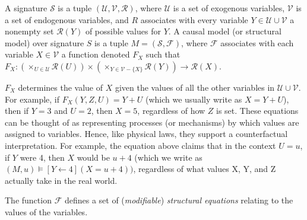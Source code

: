 \documentclass{article}
\begin{document}
A signature $\mathcal{S}$ is a tuple $(\mathcal{U},\mathcal{V},\mathcal{R})$,
where $\mathcal{U}$ is a set of exogenous variables, $\mathcal{V}$
is a set of endogenous variables, and $R$ associates with every variable
$Y\in \mathcal{U}\cup \mathcal{V}$ a nonempty set $\mathcal{R}(Y)$ of possible values for $Y$.
A causal model (or structural model) over signature $S$ is a tuple
$M=(\mathcal{S},\mathcal{F})$, where $\mathcal{F}$ associates with
each variable $X \in \mathcal{V}$ a function denoted $F_X$ such that
$F_X: (\times_{U\in \mathcal{U}}\mathcal{R}(U))\times (\times_{Y\in\mathcal{V}-\{X\}}\mathcal{R}(Y))\rightarrow \mathcal{R}(X)$.

$F_X$ determines the value of $X$ given the values of all the other variables
in $\mathcal{U}\cup \mathcal{V}$.
For example, if $F_X(Y,Z,U)=Y+U$ (which we usually write as $X = Y + U$),
then if $Y=3$ and $U=2$, then $X = 5$, regardless of how $Z$ is set.
These equations can be thought of as representing processes (or mechanisms) by which values are assigned to variables. Hence, like physical laws, they support a counterfactual interpretation.
For example, the equation above claims that in the context $U=u$, if $Y$ were 4, then $X$ would be $u+4$ (which we write as $(M,u) \models [Y\leftarrow 4](X = u + 4))$, regardless of what values X, Y, and Z actually take in the real world.


The function $\mathcal{F}$ defines a set of (\textit{modifiable}) \textit{structural equations} relating to the values of the variables.
\end{document}

